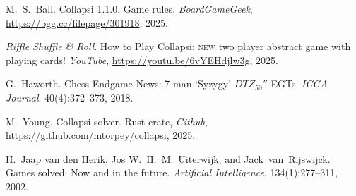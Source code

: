 \documentclass[a4paper, twocolumn]{article}
\begin{document}
\begin{thebibliography}{9}

  M.~S.~Ball.
  Collapsi 1.1.0.
  Game rules,
  \textit{BoardGameGeek},
  \url{https://bgg.cc/filepage/301918},
  2025.

  \textit{Riffle Shuffle \& Roll}.
  How to Play Collapsi: \textsc{new} two player abstract game with playing cards!
  \textit{YouTube},
  \url{https://youtu.be/6vYEHdjlw3g},
  2025.

  G.~Haworth.
  Chess Endgame News: 7-man `Syzygy' $DTZ_{50}''$ EGTs.
  \textit{ICGA Journal}. 40(4):372--373,
  2018.

  M.~Young.
  Collapsi solver.
  Rust crate,
  \textit{Github},
  \url{https://github.com/mtorpey/collapsi},
  2025.

  H.~Jaap van den Herik, Jos W.~H.~M.~Uiterwijk, and Jack~van~Rijswijck.
  Games solved: Now and in the future.
  \textit{Artificial Intelligence}, 134(1):277--311,
  2002.

\end{thebibliography}
\end{document}
